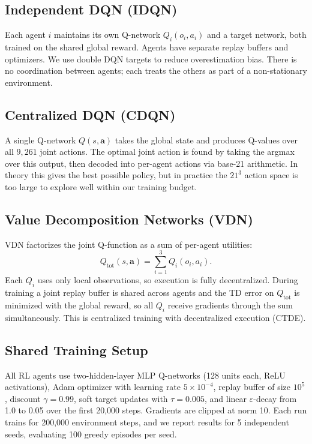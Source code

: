 \documentclass{article}
\begin{document}
\subsection{Independent DQN (IDQN)}

Each agent $i$ maintains its own Q-network $Q_i(o_i, a_i)$ and a
target network, both trained on the shared global reward. Agents have
separate replay buffers and optimizers. We use double DQN targets
\cite{van2016deep} to reduce overestimation bias. There is no
coordination between agents; each treats the others as part of a
non-stationary environment.

\subsection{Centralized DQN (CDQN)}

A single Q-network $Q(s, \mathbf{a})$ takes the global state and
produces Q-values over all $9{,}261$ joint actions. The optimal joint
action is found by taking the argmax over this output, then decoded
into per-agent actions via base-21 arithmetic. In theory this gives
the best possible policy, but in practice the $21^3$ action space is
too large to explore well within our training budget.

\subsection{Value Decomposition Networks (VDN)}

VDN \cite{sunehag2018value} factorizes the joint Q-function as a sum
of per-agent utilities:
\[
  Q_\text{tot}(s, \mathbf{a}) = \sum_{i=1}^{3} Q_i(o_i, a_i).
\]
Each $Q_i$ uses only local observations, so execution is fully
decentralized. During training a joint replay buffer is shared across
agents and the TD error on $Q_\text{tot}$ is minimized with the global
reward, so all $Q_i$ receive gradients through the sum simultaneously.
This is centralized training with decentralized execution (CTDE).

\subsection{Shared Training Setup}

All RL agents use two-hidden-layer MLP Q-networks (128 units each,
ReLU activations), Adam optimizer with learning rate $5 \times 10^{-4}$,
replay buffer of size $10^5$, discount $\gamma = 0.99$, soft target
updates with $\tau = 0.005$, and linear $\varepsilon$-decay from 1.0
to 0.05 over the first 20,000 steps. Gradients are clipped at norm 10.
Each run trains for 200,000 environment steps, and we report results
for 5 independent seeds, evaluating 100 greedy episodes per seed.
\end{document}
